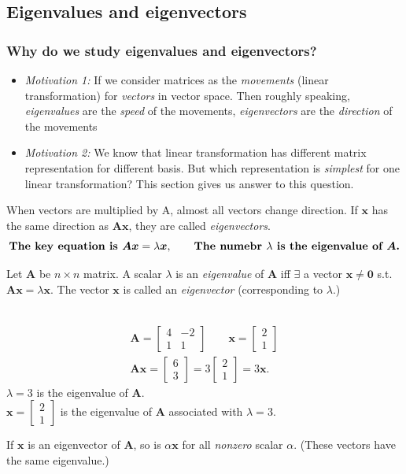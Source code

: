 \subsection{Eigenvalues and eigenvectors}
\subsubsection{Why do we study eigenvalues and eigenvectors?}
\begin{itemize}
\item
\emph{Motivation 1: }If we consider matrices as the \textit{movements} (linear transformation) for \textit{vectors} in vector space. Then roughly speaking, \textit{eigenvalues} are the \textit{speed} of the movements, \textit{eigenvectors} are the \textit{direction} of the movements
\item
\emph{Motivation 2: }We know that linear transformation has different matrix representation for different basis. But which representation is \emph{simplest} for one linear transformation? This section gives us answer to this question.
\end{itemize}
When vectors are multiplied by A, almost all vectors change direction. If $\bm x$ has the same direction as $\bm{Ax}$, they are called \emph{eigenvectors}.
\[
\text{\textbf{The key equation is }}\bm{Ax}=\lambda\bm x,\qquad\text{\textbf{The numebr $\lambda$ is the eigenvalue of $\bm A$.}}
\]
\begin{definition}
Let $\bm A$ be $n\times n$ matrix. A scalar $\lambda$ is an \emph{eigenvalue} of $\bm A$ iff $\exists$ a vector $\bm x\ne \bm 0$ s.t. $\bm{Ax}=\lambda \bm x$. The vector $\bm x$ is called an \emph{eigenvector} (corresponding to $\lambda$.)
\end{definition}
\begin{example}\qquad\\
\begin{gather*}
\bm A=\begin{bmatrix}
4&-2\\1&1
\end{bmatrix}\qquad\bm x=\begin{bmatrix}
2\\1
\end{bmatrix}\\
\bm{Ax}=\begin{bmatrix}
6\\3
\end{bmatrix}=3\begin{bmatrix}
2\\1
\end{bmatrix}=3\bm x.
\end{gather*}
$\lambda=3$ is the eigenvalue of $\bm A$.\\
$\bm x=\begin{bmatrix}
2\\1
\end{bmatrix}$ is the eigenvalue of $\bm A$ associated with $\lambda=3.$
\end{example}
\begin{proposition}
If $\bm x$ is an eigenvector of $\bm A$, so is $\alpha\bm x$ for all \textit{nonzero} scalar $\alpha$. (These vectors have the same eigenvalue.)
\end{proposition}
